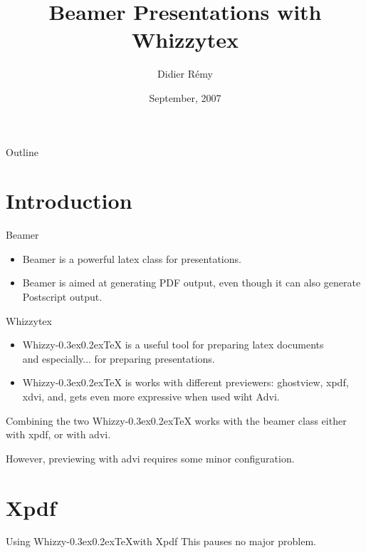 \documentclass{beamer}
\title{Beamer Presentations with Whizzytex}
\author{Didier R{\'{e}}my\inst{1}}
\institute{\inst{1}INRIA-Rocquencourt}
\date{September, 2007}
\makeatletter
\def \WhizzyTeX {{Whizzy\kern -0.3ex\raise 0.2ex\hbox{\let \@\relax\TeX}}}
\makeatother
\begin{document}
\frame{\titlepage}
\begin{frame}{Outline}
\tableofcontents
\end{frame}
\section[Intro]{Introduction}
\begin{frame}{Beamer}
\begin{itemize}
\item Beamer is a powerful latex class for presentations.
\item Beamer is aimed at generating PDF output, even though it can also
  generate Postscript output.
\end{itemize}
\end{frame}
\begin{frame}{Whizzytex}
\begin{itemize}
\item<1-> {\WhizzyTeX} is a useful tool for preparing latex documents
\\   and especially... for preparing presentations.

\item<2->
{\WhizzyTeX} is works with different previewers: ghostview, xpdf, xdvi,
and, gets even more expressive when used wiht Advi.

\end{itemize}
\end{frame}
\begin{frame}{Combining the two}
\relax
{\WhizzyTeX} works with the beamer class either
with xpdf, or  with advi.


However, previewing with advi requires some minor configuration.
\end{frame}
\section{Xpdf}
\begin{frame}{Using \WhizzyTeX with Xpdf}
This pauses no major problem.
\end{frame}
\end{document}
